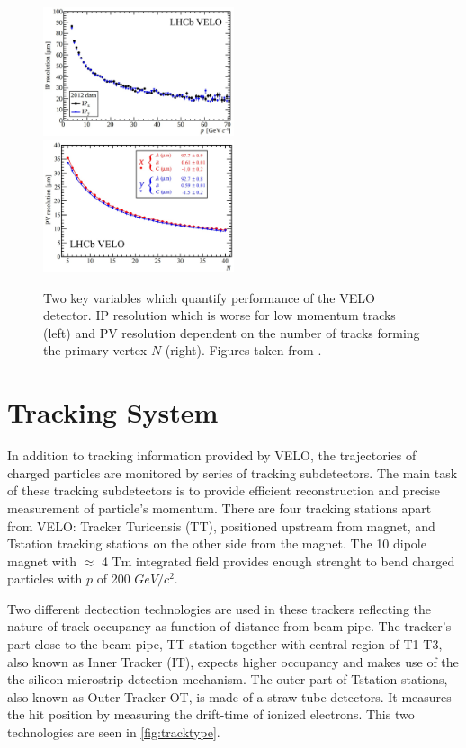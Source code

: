 \begin{figure}[!h]
	\centering
	\includegraphics[width = 0.5\textwidth]{figs/detector/IPresmhm.eps}%
        \includegraphics[width = 0.5\textwidth]{figs/detector/PVres.eps}
	\caption{Two key variables which quantify performance of the \Gls{VELO} detector. \Gls{IP} resolution which is worse for low momentum tracks (left) and \Gls{PV} resolution dependent on the number of tracks forming the primary vertex $N$ (right). Figures taken from \cite{LHCbVELOGroup:2014uea}.}
	\label{fig:veloIPres}
\end{figure}


\section{Tracking System}
In addition to tracking information provided by \Gls{VELO}, the trajectories of charged particles are monitored by series of tracking subdetectors. The main task of these tracking subdetectors is to provide efficient reconstruction and precise measurement of particle's momentum. There are four tracking stations apart from \Gls{VELO}: Tracker Turicensis (\Gls{TT}), positioned upstream from magnet, and  \Gls{Tstation} tracking stations on the other side from the magnet. The 10 \m dipole magnet with $\approx$ 4 Tm integrated field provides enough strenght to bend charged particles with $p$ of 200 $GeV/c^{2}$.      

 Two different dectection technologies are used in these trackers reflecting the nature of track occupancy as function of distance from beam pipe. The tracker's part close to the beam pipe, \Gls{TT} station together with central region of T1-T3, also known as Inner Tracker (\Gls{IT}), expects higher occupancy and makes use of the the silicon microstrip detection mechanism. The outer part of \Gls{Tstation} stations, also known as Outer Tracker \Gls{OT}, is made of a straw-tube detectors. It measures the hit position by measuring the drift-time of ionized electrons. This two technologies are seen in \autoref{fig:tracktype}. 

